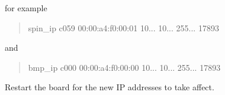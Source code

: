 for example

\begin{quote}
spin\+\_\+ip c059 00\+:00\+:a4\+:f0\+:00\+:01 10... 10... 255... 17893 \end{quote}


and

\begin{quote}
bmp\+\_\+ip c000 00\+:00\+:a4\+:f0\+:00\+:00 10... 10... 255... 17893 \end{quote}



\begin{DoxyItemize}
\item Restart the board for the new IP addresses to take affect. 
\end{DoxyItemize}
